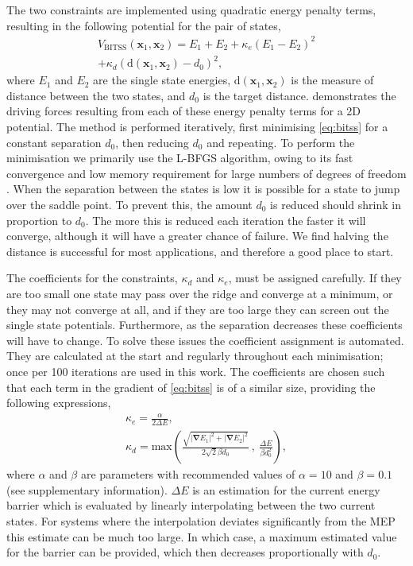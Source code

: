 \documentclass[aps,twocolumn]{revtex4}
\begin{document}
The two constraints are implemented using quadratic energy penalty terms, resulting in the following potential for the pair of states,
\begin{multline}
  V_\text{BITSS}(\bm{x}_1, \bm{x}_2) = E_1 + E_2
    + \kappa_e \left( E_1 - E_2 \right) ^2 \\
    + \kappa_d \left( \mathrm{d}(\bm{x}_1, \bm{x}_2) - d_0 \right) ^2,
  \label{eq:bitss}
\end{multline}
where $E_1$ and $E_2$ are the single state energies, $\mathrm{d}(\bm{x}_1, \bm{x}_2)$ is the measure of distance between the two states, and $d_0$ is the target distance.
 demonstrates the driving forces resulting from each of these energy penalty terms for a 2D potential.
The method is performed iteratively, first minimising \cref{eq:bitss} for a constant separation $d_0$, then reducing $d_0$ and repeating.
To perform the minimisation we primarily use the L-BFGS algorithm, owing to its fast convergence and low memory requirement for large numbers of degrees of freedom \cite{Liu1989}.
When the separation between the states is low it is possible for a state to jump over the saddle point.
To prevent this, the amount $d_0$ is reduced should shrink in proportion to $d_0$.
The more this is reduced each iteration the faster it will converge, although it will have a greater chance of failure.
We find halving the distance is successful for most applications, and therefore a good place to start.

The coefficients for the constraints, $\kappa_d$ and $\kappa_e$, must be assigned carefully.
If they are too small one state may pass over the ridge and converge at a minimum, or they may not converge at all, and if they are too large they can screen out the single state potentials.
Furthermore, as the separation decreases these coefficients will have to change.
To solve these issues the coefficient assignment is automated.
They are calculated at the start and regularly throughout each minimisation; once per 100 iterations are used in this work.
The coefficients are chosen such that each term in the gradient of \cref{eq:bitss} is of a similar size, providing the following expressions,
\begin{gather}
  \kappa_e = \frac {\alpha} {2 \Delta E},
  \label{eq:ke}
  \\
  \kappa_d = \text{max} \left(
    \frac {\sqrt{|\bm{\nabla} E_1|^2 + |\bm{\nabla} E_2|^2}} {2\sqrt{2} \beta d_0} \ , \ 
    \frac{\Delta E}{\beta d_0^2} \right),
  \label{eq:kd}
\end{gather}
where $\alpha$ and $\beta$ are parameters with recommended values of $\alpha = 10$ and $\beta = 0.1$ (see supplementary information).
$\Delta E$ is an estimation for the current energy barrier which is evaluated by linearly interpolating between the two current states.
For systems where the interpolation deviates significantly from the MEP this estimate can be much too large.
In which case, a maximum estimated value for the barrier can be provided, which then decreases proportionally with $d_0$.
\end{document}
